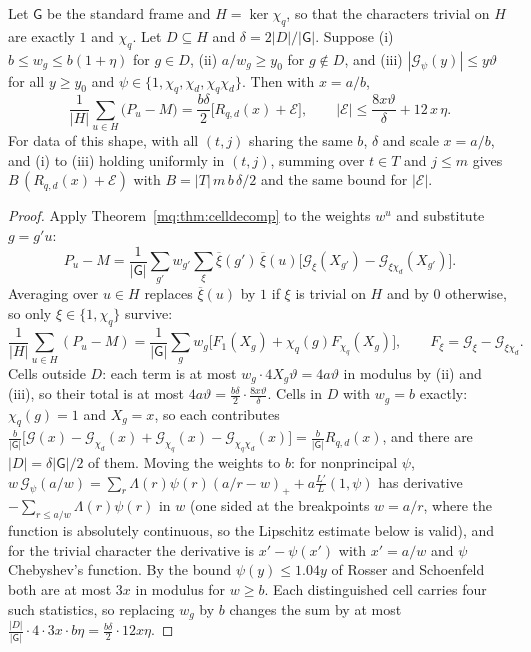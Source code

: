 \begin{theorem}\label{mq:thm:averaged}
Let $\mathsf G$ be the standard frame and $H=\ker\chi_q$, so that the characters trivial on $H$ are exactly $1$ and $\chi_q$. Let $D\subseteq H$ and $\delta=2|D|/|\mathsf G|$. Suppose (i) $b\le w_g\le b(1+\eta)$ for $g\in D$, (ii) $a/w_g\ge y_0$ for $g\notin D$, and (iii) $|\mathcal G_\psi(y)|\le y\vartheta$ for all $y\ge y_0$ and $\psi\in\{1,\chi_q,\chi_d,\chi_q\chi_d\}$. Then with $x=a/b$,
\[
\frac1{|H|}\sum_{u\in H}\big(P_u-M\big)=\frac{b\delta}2\Big[R_{q,d}(x)+\mathcal E\Big],\qquad|\mathcal E|\le\frac{8x\vartheta}\delta+12\,x\,\eta .
\]
For data of this shape, with all $(t,j)$ sharing the same $b$, $\delta$ and scale $x=a/b$, and (i) to (iii) holding uniformly in $(t,j)$, summing over $t\in T$ and $j\le m$ gives $B\,(R_{q,d}(x)+\mathcal E)$ with $B=|T|\,m\,b\,\delta/2$ and the same bound for $|\mathcal E|$.
\end{theorem}

\begin{proof}
Apply Theorem~\ref{mq:thm:celldecomp} to the weights $w^u$ and substitute $g=g'u$:
\[
P_u-M=\frac1{|\mathsf G|}\sum_{g'}w_{g'}\sum_\xi\overline\xi(g')\,\overline\xi(u)\Big[\mathcal G_\xi(X_{g'})-\mathcal G_{\xi\chi_d}(X_{g'})\Big].
\]
Averaging over $u\in H$ replaces $\overline\xi(u)$ by $1$ if $\xi$ is trivial on $H$ and by $0$ otherwise, so only $\xi\in\{1,\chi_q\}$ survive:
\[
\frac1{|H|}\sum_{u\in H}(P_u-M)=\frac1{|\mathsf G|}\sum_gw_g\Big[F_1(X_g)+\chi_q(g)F_{\chi_q}(X_g)\Big],\qquad F_\xi=\mathcal G_\xi-\mathcal G_{\xi\chi_d}.
\]
Cells outside $D$: each term is at most $w_g\cdot4X_g\vartheta=4a\vartheta$ in modulus by (ii) and (iii), so their total is at most $4a\vartheta=\frac{b\delta}2\cdot\frac{8x\vartheta}\delta$. Cells in $D$ with $w_g=b$ exactly: $\chi_q(g)=1$ and $X_g=x$, so each contributes $\frac b{|\mathsf G|}\big[\mathcal G(x)-\mathcal G_{\chi_d}(x)+\mathcal G_{\chi_q}(x)-\mathcal G_{\chi_q\chi_d}(x)\big]=\frac b{|\mathsf G|}R_{q,d}(x)$, and there are $|D|=\delta|\mathsf G|/2$ of them. Moving the weights to $b$: for nonprincipal $\psi$, $w\,\mathcal G_\psi(a/w)=\sum_r\Lambda(r)\psi(r)(a/r-w)_++a\frac{L'}L(1,\psi)$ has derivative $-\sum_{r\le a/w}\Lambda(r)\psi(r)$ in $w$ (one sided at the breakpoints $w=a/r$, where the function is absolutely continuous, so the Lipschitz estimate below is valid), and for the trivial character the derivative is $x'-\psi(x')$ with $x'=a/w$ and $\psi$ Chebyshev's function. By the bound $\psi(y)\le1.04y$ of Rosser and Schoenfeld \cite{RS62} both are at most $3x$ in modulus for $w\ge b$. Each distinguished cell carries four such statistics, so replacing $w_g$ by $b$ changes the sum by at most $\frac{|D|}{|\mathsf G|}\cdot4\cdot3x\cdot b\eta=\frac{b\delta}2\cdot12x\eta$.
\end{proof}

